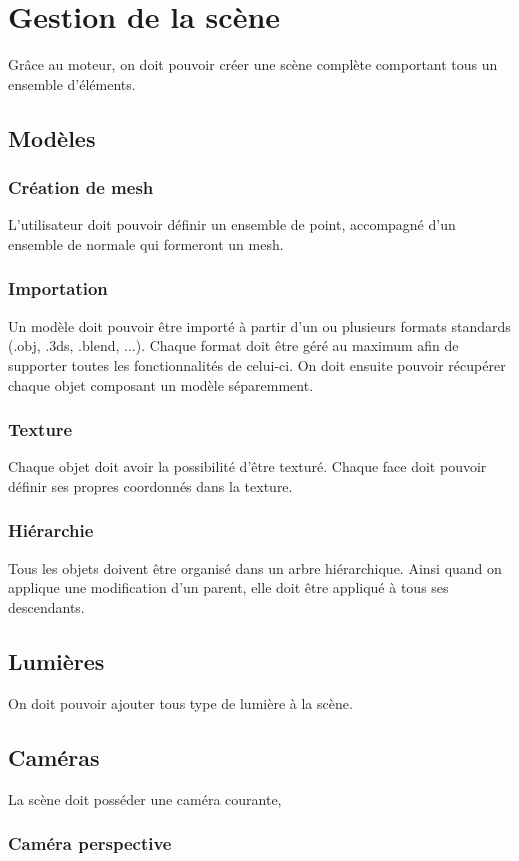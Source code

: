\documentclass [a4 paper,11pt]{article}
\begin{document}
\section{Gestion de la scène}
Grâce au moteur, on doit pouvoir créer une scène complète comportant tous un ensemble d'éléments.
\subsection{Modèles}

\subsubsection*{Création de mesh}
L'utilisateur doit pouvoir définir un ensemble de point, accompagné d'un ensemble de normale qui formeront un mesh.
\subsubsection*{Importation}
Un modèle doit pouvoir être importé à partir d'un ou plusieurs formats standards (.obj, .3ds, .blend, ...).
Chaque format doit être géré au maximum afin de supporter toutes les fonctionnalités de celui-ci.
On doit ensuite pouvoir récupérer chaque objet composant un modèle séparemment.
\subsubsection*{Texture}
Chaque objet doit avoir la possibilité d'être texturé.
Chaque face doit pouvoir définir ses propres coordonnés dans la texture.
\subsubsection*{Hiérarchie}
Tous les objets doivent être organisé dans un arbre hiérarchique.
Ainsi quand on applique une modification d'un parent, elle doit être appliqué à tous ses descendants.

\subsection{Lumières}
On doit pouvoir ajouter tous type de lumière à la scène.

\subsection{Caméras}
La scène doit posséder une caméra courante, 

\subsubsection*{Caméra perspective}
\end{document}
